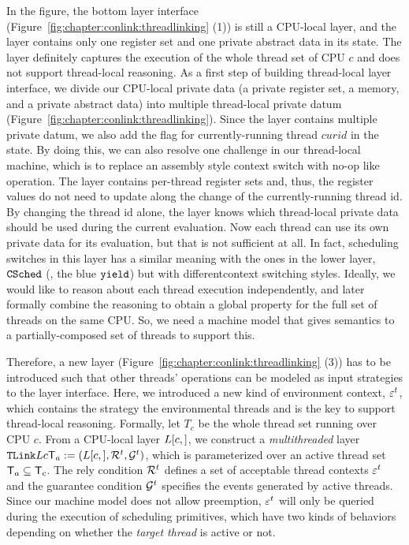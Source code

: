 In the figure, the bottom layer interface (\cf Figure~\ref{fig:chapter:conlink:threadlinking} (1)) is still a CPU-local layer,
and the layer contains only one register set and one private abstract data in its state.
The layer definitely captures the execution of the whole thread set of CPU $c$ 
and does not support thread-local reasoning.
As a first step of building thread-local layer interface, 
we divide our CPU-local private data (a private register set, a memory, and a private abstract data) into multiple thread-local
private datum (Figure~\ref{fig:chapter:conlink:threadlinking}). 
Since the layer contains multiple private datum, we also add the flag for currently-running thread $curid$ in the state. 
By doing this, we can also resolve one challenge in our thread-local machine, which is to replace an assembly style 
context switch with no-op like operation. 
The layer contains per-thread register sets and, thus, the register values do not need to update along the change of the currently-running thread id. By changing the thread id alone, the layer knows which thread-local private data should be 
used during the current evaluation.
Now each thread can use its own private data for its evaluation, but that is not sufficient at all. 
In fact, scheduling switches in this layer has a similar meaning with the ones in the lower layer, 
${{\mathrm{\texttt{CSched}}}}$ (\ie, the blue ${\mathrm{\texttt{yield}}}$) but with differentcontext switching styles.
Ideally, we would like to reason about each thread execution 
independently, and later formally combine the reasoning to obtain a global
property for the full set of threads on the same CPU.
So, we need a machine model that gives semantics to
a partially-composed set of threads to support this.

Therefore,  a new layer (\cf Figure~\ref{fig:chapter:conlink:threadlinking} (3)) has to be introduced such that other 
threads' operations can be modeled as input strategies to the layer interface. 
Here, we introduced a new kind of environment context, ${\varepsilon}^{t}$, which contains the strategy the environmental threads and is the key to support  thread-local reasoning.
Formally, let $T_c$ be the whole thread set running over CPU $c$.
From a CPU-local layer  $L[c, ]$,  we construct a 
 \emph{multithreaded} layer ${{\mathrm{\texttt{TLink}}}}{L}{c}{\mathsf{T}_a} := (L[c, ],
 \mathcal{R}^t, \mathcal{G}^t)$,
which is 
parameterized over an active thread set $\mathsf{T}_a \subseteq \mathsf{T}_{\mathrm{c}}$.
The rely condition $\mathcal{R}^t$ defines a set of acceptable thread contexts
${\varepsilon}^t$ and the guarantee condition $\mathcal{G}^t$ specifies the events generated by active threads. 
Since our machine model does not allow
preemption, ${\varepsilon}^t$ will only be queried during the execution of scheduling primitives, 
which have two kinds
of behaviors  depending on whether the \emph{target
thread} is active or not.

